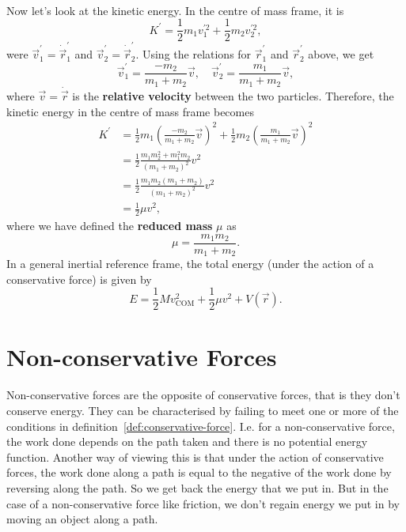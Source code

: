 \documentclass[../classical_mechanics.tex]{subfiles}
\begin{document}
        \paragraph{}
        Now let's look at the kinetic energy.
        In the centre of mass frame, it is
        \begin{equation}
            K^\prime=\frac{1}{2}m_1v_1^{\prime 2}+\frac{1}{2}m_2v_2^{\prime 2},
        \end{equation}
        were $\vec{v}_1^\prime=\dot{\vec{r}}_1^\prime$ and $\vec{v}_2^\prime=\dot{\vec{r}}_2^\prime$.
        Using the relations for $\vec{r}_1^\prime$ and $\vec{r}_2^\prime$ above, we get
        \begin{equation}
            \vec{v}_1^\prime=\frac{-m_2}{m_1+m_2}\vec{v},\quad\vec{v}_2^\prime=\frac{m_1}{m_1+m_2}\vec{v},
        \end{equation}
        where $\vec{v}=\dot{\vec{r}}$ is the \textbf{relative velocity} between the two particles.
        Therefore, the kinetic energy in the centre of mass frame becomes
        \begin{align}
            K^\prime&=\frac{1}{2}m_1\left(\frac{-m_2}{m_1+m_2}\vec{v}\right)^2+\frac{1}{2}m_2\left(\frac{m_1}{m_1+m_2}\vec{v}\right)^2\\
            &=\frac{1}{2}\frac{m_1m_2^2+m_1^2m_2}{(m_1+m_2)^2}v^2\\
            &=\frac{1}{2}\frac{m_1m_2(m_1+m_2)}{(m_1+m_2)^2}v^2\\
            &=\frac{1}{2}\mu v^2,
        \end{align}
        where we have defined the \textbf{reduced mass} $\mu$ as
        \begin{equation}
            \mu=\frac{m_1m_2}{m_1+m_2}.
        \end{equation}
        In a general inertial reference frame, the total energy (under the action of a conservative force) is given by
        \begin{equation}
            E=\frac{1}{2}Mv_\text{COM}^2+\frac{1}{2}\mu v^2+V(\vec{r}).
        \end{equation}

    \section{Non-conservative Forces}
        \paragraph{}
        Non-conservative forces are the opposite of conservative forces, that is they don't conserve energy.
        They can be characterised by failing to meet one or more of the conditions in definition~\ref{def:conservative-force}.
        I.e. for a non-conservative force, the work done depends on the path taken and there is no potential energy function.
        Another way of viewing this is that under the action of conservative forces, the work done along a path is equal to the negative of the work done by reversing along the path.
        So we get back the energy that we put in.
        But in the case of a non-conservative force like friction, we don't regain energy we put in by moving an object along a path.
\end{document}
